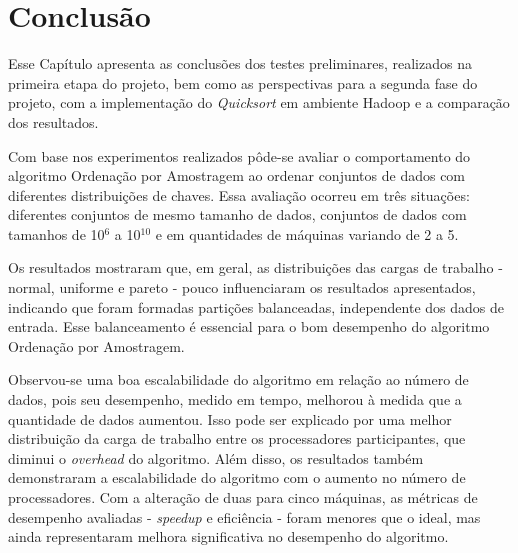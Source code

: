 \chapter{Conclusão}
\label{cap:conclusao}

Esse Capítulo apresenta as conclusões dos testes preliminares, realizados na primeira etapa do projeto, bem como as perspectivas para a segunda fase do projeto, com a implementação do \textit{Quicksort} em ambiente Hadoop e a comparação dos resultados.


 
 
Com base nos experimentos realizados pôde-se avaliar o comportamento do algoritmo Ordenação por Amostragem ao ordenar conjuntos de dados com 
diferentes distribuições de chaves. Essa avaliação ocorreu em três situações: diferentes conjuntos de mesmo tamanho de dados, conjuntos de dados com tamanhos de 10$^6$ a 10$^{10}$ e em quantidades de máquinas variando de 2 a 5.

Os resultados mostraram que, em geral, as distribuições das cargas de trabalho - normal, uniforme e pareto - pouco influenciaram os resultados apresentados,  indicando que foram formadas partições balanceadas, independente dos dados de entrada. Esse balanceamento é essencial para o bom desempenho do algoritmo Ordenação por Amostragem. 

Observou-se uma boa escalabilidade do algoritmo em relação ao número de dados, pois seu desempenho, medido em tempo, melhorou à medida que a quantidade de dados aumentou. Isso pode ser explicado por uma melhor distribuição da carga de trabalho entre os processadores participantes, que diminui o  \textit{overhead} do algoritmo.
Além disso, os resultados também demonstraram a escalabilidade do algoritmo com o aumento no número de processadores. Com a alteração de duas para cinco máquinas, as métricas de desempenho avaliadas - \textit{speedup} e eficiência - foram menores que o ideal, mas ainda representaram melhora significativa no desempenho do algoritmo. 

